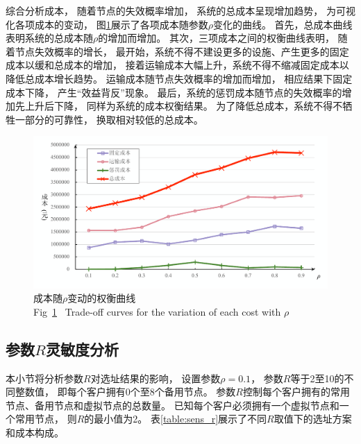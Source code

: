 综合分析成本，
随着节点的失效概率增加，
系统的总成本呈现增加趋势，
为可视化各项成本的变动，
图\ref{fig:sens_rho}展示了各项成本随参数$\rho$变化的曲线。
首先，总成本曲线表明系统的总成本随$\rho$的增加而增加。
其次，三项成本之间的权衡曲线表明，
随着节点失效概率的增长，
最开始，系统不得不建设更多的设施、产生更多的固定成本以缓和总成本的增加，
接着运输成本大幅上升，系统不得不缩减固定成本以降低总成本增长趋势。
运输成本随节点失效概率的增加而增加，
相应结果下固定成本下降，
产生``效益背反''现象。
最后，系统的惩罚成本随节点的失效概率的增加先上升后下降，
同样为系统的成本权衡结果。
为了降低总成本，系统不得不牺牲一部分的可靠性，
换取相对较低的总成本。

\begin{figure}[hbt] %
	\setlength{\belowcaptionskip}{-0.5cm} 
	  \centering
	  \includegraphics[width = 0.9 \textwidth]{figures/sens_rho.pdf}
	  \caption{成本随$\rho$变动的权衡曲线\\
	  Fig~\ref{fig:sens_rho}~ Trade-off curves for the variation of each cost with $\rho$}
	  \label{fig:sens_rho}
\end{figure}

\subsection{参数\texorpdfstring{$R$}{R}灵敏度分析}
本小节将分析参数$R$对选址结果的影响，
设置参数$\rho=0.1$，
参数$R$等于2至10的不同整数值，
即每个客户拥有0个至8个备用节点。
参数$R$控制每个客户拥有的常用节点、备用节点和虚拟节点的总数量。
已知每个客户必须拥有一个虚拟节点和一个常用节点，
则$R$的最小值为2。
表\ref{table:sens_r}展示了不同$R$取值下的选址方案和成本构成。



